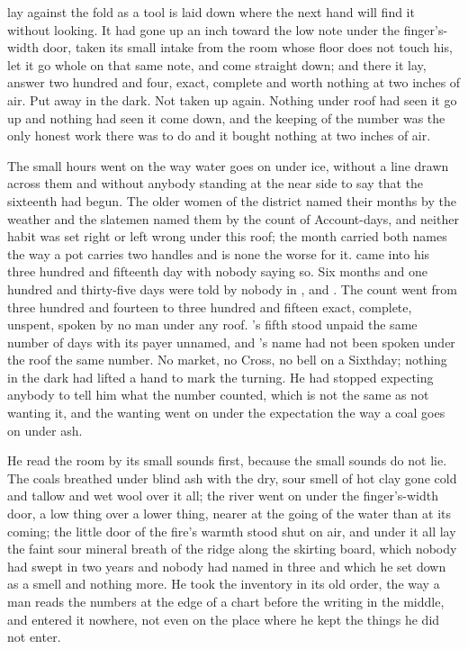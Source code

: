 
 lay against the fold as a tool is laid down where the next hand will find it without looking. It had gone up an inch toward the low note under the finger's-width door, taken its small intake from the room whose floor does not touch his, let it go whole on that same note, and come straight down; and there it lay, answer two hundred and four, exact, complete and worth nothing at two inches of air. Put away in the dark. Not taken up again. Nothing under  roof had seen it go up and nothing had seen it come down, and the keeping of the number was the only honest work there was to do and it bought nothing at two inches of air.

The small hours went on the way water goes on under ice, without a line drawn across them and without anybody standing at the near side to say that the sixteenth had begun. The older women of the district named their months by the weather and the slatemen named them by the count of Account-days, and neither habit was set right or left wrong under this roof; the month carried both names the way a pot carries two handles and is none the worse for it.  came into his three hundred and fifteenth day with nobody saying so. Six months and one hundred and thirty-five days were told by nobody in ,  and . The count went from three hundred and fourteen to three hundred and fifteen exact, complete, unspent, spoken by no man under any roof. 's fifth stood unpaid the same number of days with its payer unnamed, and 's name had not been spoken under the roof the same number. No market, no Cross, no bell on a Sixthday; nothing in the dark had lifted a hand to mark the turning. He had stopped expecting anybody to tell him what the number counted, which is not the same as not wanting it, and the wanting went on under the expectation the way a coal goes on under ash.

He read the room by its small sounds first, because the small sounds do not lie. The coals breathed under blind ash with the dry, sour smell of hot clay gone cold and tallow and wet wool over it all; the river went on  under the finger's-width door, a low thing over a lower thing, nearer at the going of the water than at its coming; the little door of the fire's warmth stood shut on air, and under it all lay the faint sour mineral breath of the  ridge along the skirting board, which nobody had swept in two years and nobody had named in three and which he set down as a smell and nothing more. He took the inventory in its old order, the way a man reads the numbers at the edge of a chart before the writing in the middle, and entered it nowhere, not even on the place where he kept the things he did not enter.

